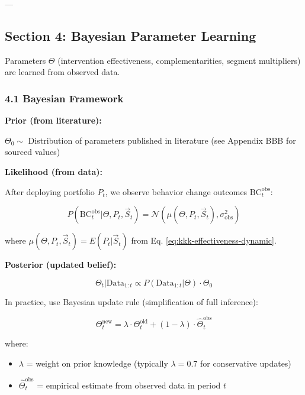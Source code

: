 ---

\subsection*{Section 4: Bayesian Parameter Learning}
\label{sec:kkk-learning}

Parameters $\Theta$ (intervention effectiveness, complementarities, segment multipliers) are learned from observed data.

\subsubsection*{4.1 Bayesian Framework}

\textbf{Prior (from literature):}

$\Theta_0 \sim$ Distribution of parameters published in literature (see Appendix BBB for sourced values)

\textbf{Likelihood (from data):}

After deploying portfolio $P_t$, we observe behavior change outcomes $\text{BC}_t^{\text{obs}}$:

\begin{equation}
P(\text{BC}_t^{\text{obs}} | \Theta, P_t, \vec{S}_t) = \mathcal{N}(\mu(\Theta, P_t, \vec{S}_t), \sigma^2_{\text{obs}})
\label{eq:kkk-likelihood}
\end{equation}

where $\mu(\Theta, P_t, \vec{S}_t) = E(P_t | \vec{S}_t)$ from Eq. \ref{eq:kkk-effectiveness-dynamic}.

\textbf{Posterior (updated belief):}

\begin{equation}
\Theta_t | \text{Data}_{1:t} \propto P(\text{Data}_{1:t} | \Theta) \cdot \Theta_0
\label{eq:kkk-posterior}
\end{equation}

In practice, use Bayesian update rule (simplification of full inference):

\begin{equation}
\Theta_t^{\text{new}} = \lambda \cdot \Theta_t^{\text{old}} + (1-\lambda) \cdot \hat{\Theta}_t^{\text{obs}}
\label{eq:kkk-bayesian-update-simple}
\end{equation}

where:
\begin{itemize}[nosep]
\item $\lambda$ = weight on prior knowledge (typically $\lambda = 0.7$ for conservative updates)
\item $\hat{\Theta}_t^{\text{obs}}$ = empirical estimate from observed data in period $t$
\end{itemize}

